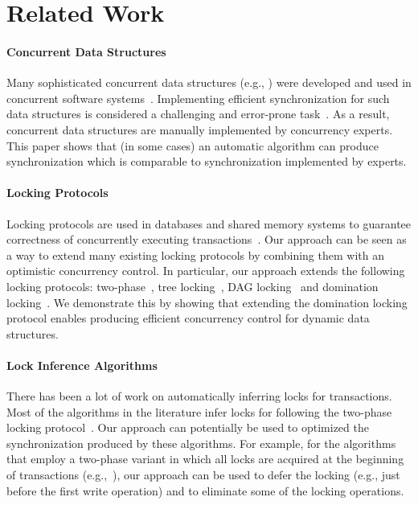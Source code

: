 \section{Related Work}\label{sec:related}
\paragraph{Concurrent Data Structures}
Many sophisticated concurrent data structures (e.g., \cite{ArbelA2014,DrachslerVY2014,NatarajanM2014,BrownER2014,CrainGR2013,BraginskyP2012,
AfekKKMT2012,EllenFRB2010,BronsonCCO2010,HerlihyLLS2007,Michael:1996})
were developed and used in concurrent software systems~\cite{Ohad:OOPSLA11}.
Implementing efficient synchronization for such data structures is considered a challenging and error-prone task~\cite{Ohad:OOPSLA11,Doh:SPAA04,Jin:2012}.
As a result, concurrent data structures are manually implemented by concurrency experts.
This paper shows that (in some cases) an automatic algorithm can produce synchronization which is comparable to synchronization implemented by experts.

\paragraph{Locking Protocols}
Locking protocols are used in databases and shared memory systems to guarantee correctness
of concurrently executing transactions~\cite{Weikum:2001,BHG:Book87}.
Our approach can be seen as a way to extend many existing locking protocols by combining them with an optimistic concurrency control.
In particular, our approach extends the following locking protocols:
two-phase~\cite{Eswaran:1976}, tree locking~\cite{SilberschatzK1980}, DAG locking~\cite{CH:PODS95} and domination locking~\cite{Gueta2011}.
We demonstrate this by showing that extending the  domination locking protocol enables producing efficient concurrency control for
dynamic data structures.


\paragraph{Lock Inference Algorithms}
There has been a lot of work on automatically inferring locks for transactions.
Most of the algorithms in the literature infer locks for following the two-phase
locking protocol~\cite{MZGB:POPL06,Emmi06POPL,gudka2012lock,CCG:PLDI08,HFP:TRANSACT06,CGE:CC08}.
Our approach can potentially be used to optimized the synchronization produced by these algorithms.
For example, for the algorithms that employ a two-phase variant in which all locks are acquired at the beginning of transactions (e.g.,~\cite{gudka2012lock,CCG:PLDI08}),
our approach can be used to defer the locking (e.g., just before the first write operation) and to eliminate some of the locking operations.


